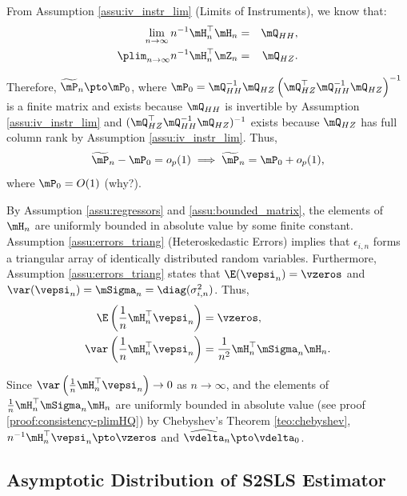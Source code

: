 \documentclass[english,12pt]{book}\usepackage[]{graphicx}\usepackage[]{xcolor}
\begin{document}
From Assumption \ref{assu:iv_instr_lim} (Limits of Instruments), we know that:
\begin{eqnarray*}
\lim_{n\to \infty} n^{-1}\mH_n^\top\mH_n &=& \mQ_{HH},\\
\plim_{n\to \infty} n^{-1}\mH_n^\top\mZ_n &=& \mQ_{HZ}.
\end{eqnarray*}

Therefore,  $\widetilde{\mP}_n\pto \mP_0$, where $\mP_0=\mQ_{HH}^{-1}\mQ_{HZ}\left(\mQ_{HZ}^\top\mQ_{HH}^{-1}\mQ_{HZ}\right)^{-1}$ is a finite matrix and exists because $\mQ_{HH}$ is invertible by Assumption \ref{assu:iv_instr_lim} and $(\mQ_{HZ}^\top\mQ_{HH}^{-1}\mQ_{HZ})^{-1}$ exists because $\mQ_{HZ}$ has full column rank by Assumption \ref{assu:iv_instr_lim}. Thus,
\begin{equation}\label{eq:P_conver}
\widetilde{\mP}_n - \mP_0 = o_p(1)\implies \widetilde{\mP}_n= \mP_0 + o_p(1), 
\end{equation}
%
where $\mP_0 = O(1)$ (why?).

By Assumption \ref{assu:regressors} and \ref{assu:bounded_matrix}, the elements of $\mH_n$ are uniformly bounded in absolute value by some finite constant. Assumption \ref{assu:errors_triang} (Heteroskedastic Errors) implies that $\epsilon_{i,n}$ forms a triangular array of identically distributed random variables. Furthermore, Assumption \ref{assu:errors_triang} states that  $\E(\vepsi_n) = \vzeros$ and $\var(\vepsi_n) = \mSigma_n =\diag(\sigma^2_{i, n})$. Thus,
\begin{equation*}
  \begin{aligned}
    \E\left(\frac{1}{n}\mH^\top_n\vepsi_n\right)   & = \vzeros, \\
    \var\left(\frac{1}{n}\mH^\top_n\vepsi_n\right) & = \frac{1}{n^2}\mH^\top_n\mSigma_n\mH_n.
  \end{aligned}
\end{equation*}

Since $\var\left(\frac{1}{n}\mH^\top_n\vepsi_n\right)\to 0$ as $n\to \infty$,  and the elements of $\frac{1}{n}\mH_n^\top\mSigma_n\mH_n$ are uniformly bounded in absolute value (see proof \ref{proof:consistency-plimHQ}) by Chebyshev's Theorem \ref{teo:chebyshev}, $n^{-1}\mH^\top_n\vepsi_n\pto \vzeros$ and $\widehat{\vdelta}_n\pto \vdelta_0$.


\subsection{Asymptotic Distribution of S2SLS Estimator}
\end{document}
